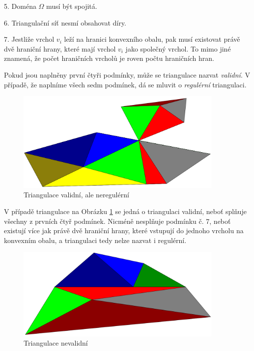 \documentclass[12pt,a4paper]{article}
\begin{document}
5. Doména $\Omega$ musí být spojitá.

6. Triangulační síť nesmí obsahovat díry.

7. Jestliže vrchol $v_i$ leží na hranici konvexního obalu, pak musí existovat právě dvě hraniční hrany, které mají vrchol $v_i$ jako společný vrchol. To mimo jiné znamená, že počet hraničních vrcholů je roven počtu hraničních hran.

\bigskip
Pokud jsou naplněny první čtyři podmínky, může se triangulace nazvat \emph{validní}. V případě, že naplníme všech sedm podmínek, dá se mluvit o \emph{regulérní} triangulaci.

\begin{figure}[h!]
\centering
\includegraphics[width=0.9\textwidth]{img/vnr.png}
\caption{Triangulace validní, ale neregulérní}
\label{fig:trian_valid_not_reg}
\end{figure}

V případě triangulace na Obrázku \ref{fig:trian_valid_not_reg} se jedná o triangulaci validní, neboť splňuje všechny z prvních čtyř podmínek. Nicméně nesplňuje podmínku č. 7, neboť existují více jak právě dvě hraniční hrany, které vstupují do jednoho vrcholu na konvexním obalu, a triangulaci tedy nelze nazvat i regulérní.

\begin{figure}[h!]
\centering
\includegraphics[width=0.9\textwidth]{img/nv.png}
\caption{Triangulace nevalidní}
\label{fig:train_not_valid}
\end{figure}
\end{document}
